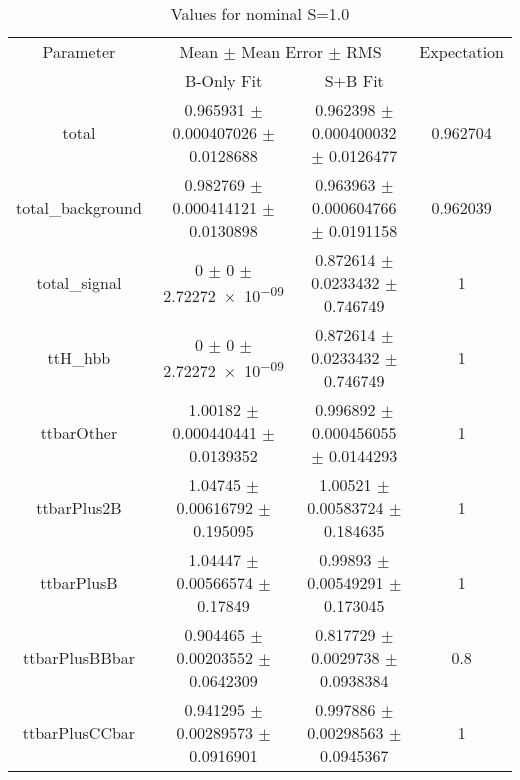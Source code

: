\begin{table}
\centering
\caption{Values for nominal S=1.0}
\begin{tabular}{cccc}
\toprule
Parameter & \multicolumn{2}{c}{Mean $\pm$ Mean Error $\pm$ RMS} & Expectation\\
 & B-Only Fit & S+B Fit & \\
\midrule
total & \num{0.965931} $\pm$ \num{0.000407026} $\pm$ \num{0.0128688} & \num{0.962398} $\pm$ \num{0.000400032} $\pm$ \num{0.0126477} & \num{0.962704}\\
total\_background & \num{0.982769} $\pm$ \num{0.000414121} $\pm$ \num{0.0130898} & \num{0.963963} $\pm$ \num{0.000604766} $\pm$ \num{0.0191158} & \num{0.962039}\\
total\_signal & \num{0} $\pm$ \num{0} $\pm$ \num{2.72272e-09} & \num{0.872614} $\pm$ \num{0.0233432} $\pm$ \num{0.746749} & \num{1}\\
ttH\_hbb & \num{0} $\pm$ \num{0} $\pm$ \num{2.72272e-09} & \num{0.872614} $\pm$ \num{0.0233432} $\pm$ \num{0.746749} & \num{1}\\
ttbarOther & \num{1.00182} $\pm$ \num{0.000440441} $\pm$ \num{0.0139352} & \num{0.996892} $\pm$ \num{0.000456055} $\pm$ \num{0.0144293} & \num{1}\\
ttbarPlus2B & \num{1.04745} $\pm$ \num{0.00616792} $\pm$ \num{0.195095} & \num{1.00521} $\pm$ \num{0.00583724} $\pm$ \num{0.184635} & \num{1}\\
ttbarPlusB & \num{1.04447} $\pm$ \num{0.00566574} $\pm$ \num{0.17849} & \num{0.99893} $\pm$ \num{0.00549291} $\pm$ \num{0.173045} & \num{1}\\
ttbarPlusBBbar & \num{0.904465} $\pm$ \num{0.00203552} $\pm$ \num{0.0642309} & \num{0.817729} $\pm$ \num{0.0029738} $\pm$ \num{0.0938384} & \num{0.8}\\
ttbarPlusCCbar & \num{0.941295} $\pm$ \num{0.00289573} $\pm$ \num{0.0916901} & \num{0.997886} $\pm$ \num{0.00298563} $\pm$ \num{0.0945367} & \num{1}\\
\bottomrule
\end{tabular}
\end{table}